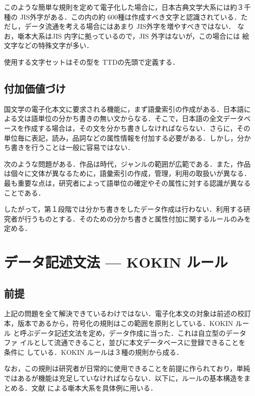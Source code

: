 このような簡単な規則を定めて電子化した場合に，日本古典文学大系には約３千
種の JIS外字がある．この内の約 600種は作成すべき文字と認識されている．た
だし，データ流通を考える場合にはあまり JIS外字を増やすべきではない．
なお，噺本大系はJIS 内字に拠っているので，JIS 外字はないが，この場合には
絵文字などの特殊文字が多い．

使用する文字セットはその型を TTDの先頭で定義する．

\subsection{付加価値づけ}
\label{sec:3.3setu}

国文学の電子化本文に要求される機能に，まず語彙索引の作成がある．日本語に
よる文は語単位の分かち書きの無い文からなる．そこで，日本語の全文データベ
ースを作成する場合は，その文を分かち書きしなければならない．さらに，その
単位毎に表記，読み，品詞などの属性情報を付加する必要がある．しかし，分か
ち書きを行うことは一般に容易ではない．

次のような問題がある．作品は時代，ジャンルの範囲が広範である．また，作品
は個々に文体が異なるために，語彙索引の作成，管理，利用の取扱いが異なる．
最も重要な点は，研究者によって語単位の確定やその属性に対する認識が異なる
ことである．

したがって，第１段階では分かち書きをしたデータ作成は行わない．利用する研
究者が行うものとする．そのための分かち書きと属性付加に関するルールのみを
定める．


\section{データ記述文法 --- KOKIN ルール}
\label{sec:4shou}


\subsection{前提}
\label{sec:4.1setu}

上記の問題を全て解決できているわけではない．電子化本文の対象は前述の校訂
本，版本であるから，符号化の規則はこの範囲を原則としている．KOKIN ルール
と呼ぶデータ記述文法を定め，データ作成に当った．これは自立型のデータファ
イルとして流通できること，並びに本文データベースに登録できることを条件に
している．KOKIN ルールは３種の規則から成る．

なお，この規則は研究者が日常的に使用できることを前提に作られており，単純
ではあるが機能は充足していなければならない．以下に，ルールの基本構造をま
とめる．文献\cite{yasunaga:95a} による噺本大系を具体例に用いる．


